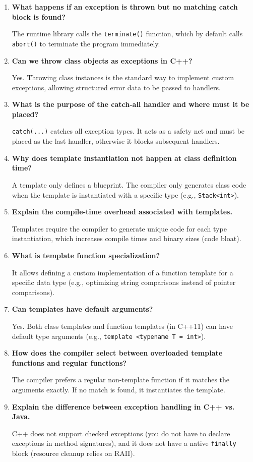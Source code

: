 \documentclass[12pt,a4paper]{article}
\newcommand{\Q}[1]{\textbf{#1}\par\noindent\ignorespaces}
\begin{document}
\begin{tcolorbox}[exambox, title={\textbf{Frequently Asked / Viva Questions}}]
\begin{enumerate}[topsep=0pt, label=\textbf{Q\arabic*.}, itemsep=5pt]
  \item \Q{What happens if an exception is thrown but no matching catch block is found?}
    The runtime library calls the \texttt{terminate()} function, which by default calls \texttt{abort()} to terminate the program immediately.
  \item \Q{Can we throw class objects as exceptions in C++?}
    Yes. Throwing class instances is the standard way to implement custom exceptions, allowing structured error data to be passed to handlers.
  \item \Q{What is the purpose of the catch-all handler and where must it be placed?}
    \texttt{catch(...)} catches all exception types. It acts as a safety net and must be placed as the last handler, otherwise it blocks subsequent handlers.
  \item \Q{Why does template instantiation not happen at class definition time?}
    A template only defines a blueprint. The compiler only generates class code when the template is instantiated with a specific type (e.g., \texttt{Stack<int>}).
  \item \Q{Explain the compile-time overhead associated with templates.}
    Templates require the compiler to generate unique code for each type instantiation, which increases compile times and binary sizes (code bloat).
  \item \Q{What is template function specialization?}
    It allows defining a custom implementation of a function template for a specific data type (e.g., optimizing string comparisons instead of pointer comparisons).
  \item \Q{Can templates have default arguments?}
    Yes. Both class templates and function templates (in C++11) can have default type arguments (e.g., \texttt{template <typename T = int>}).
  \item \Q{How does the compiler select between overloaded template functions and regular functions?}
    The compiler prefers a regular non-template function if it matches the arguments exactly. If no match is found, it instantiates the template.
  \item \Q{Explain the difference between exception handling in C++ vs. Java.}
    C++ does not support checked exceptions (you do not have to declare exceptions in method signatures), and it does not have a native \texttt{finally} block (resource cleanup relies on RAII).

\end{enumerate}
\end{tcolorbox}
\end{document}

